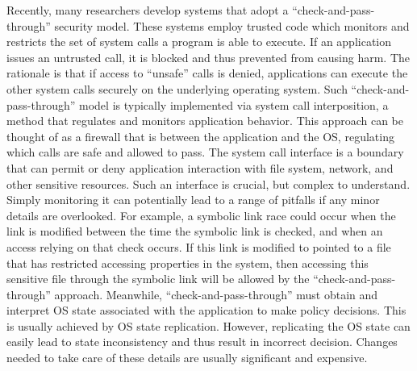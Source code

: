 

\par
Recently, many researchers develop systems that adopt a ``check-and-pass-through'' security model. These systems employ trusted code which monitors and restricts the set of system calls a program is able to execute. If an application issues an untrusted call, it is blocked and thus prevented from causing harm. The rationale is that if access to ``unsafe'' calls is denied, applications can execute the other system calls securely on the underlying operating system. Such ``check-and-pass-through'' model is typically implemented via system call interposition, a method that regulates and monitors application behavior. This approach can be thought of as a firewall that is between the application and the OS, regulating which calls are safe and allowed to pass. The system call interface is a boundary that can permit or deny application interaction with file system, network, and other sensitive resources. Such an interface is crucial, but complex to understand. Simply monitoring it can potentially lead to a range of pitfalls if any minor details are overlooked. For example, a symbolic link race could occur when the link is modified between the time the symbolic link is checked, and when an access relying on that check occurs. If this link is modified to pointed to a file that has restricted accessing properties in the system, then accessing this sensitive file through the symbolic link will be allowed by the ``check-and-pass-through'' approach. Meanwhile, ``check-and-pass-through'' must obtain and interpret OS state associated with the application to make policy decisions. This is usually achieved by OS state replication. However, replicating the OS state can easily lead to state inconsistency and thus result in incorrect decision. Changes needed to take care of these details are usually significant and expensive.


